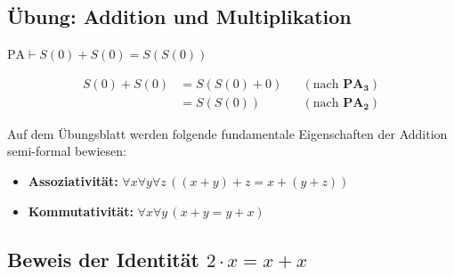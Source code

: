 \subsection{Übung: Addition und Multiplikation}
\begin{math-stroke}
\begin{example}
$\text{PA} \vdash S(0) + S(0) = S(S(0))$
\end{example}

\begin{short-proof}
\begin{align*}
    S(0) + S(0) &= S(S(0) + 0) && (\text{nach } \mathbf{PA_3}) \\
    &= S(S(0)) && (\text{nach } \mathbf{PA_2})
\end{align*}
\end{short-proof}

\begin{remark}
Auf dem Übungsblatt werden folgende fundamentale Eigenschaften der Addition semi-formal bewiesen:
\begin{itemize}
    \item \textbf{Assoziativität:} $\forall x \forall y \forall z \, ((x + y) + z = x + (y + z))$
    \item \textbf{Kommutativität:} $\forall x \forall y \, (x + y = y + x)$
\end{itemize}
\end{remark}
\end{math-stroke}

\subsection{Beweis der Identität \texorpdfstring{$2 \cdot x = x + x$}{2x = x+x}}

